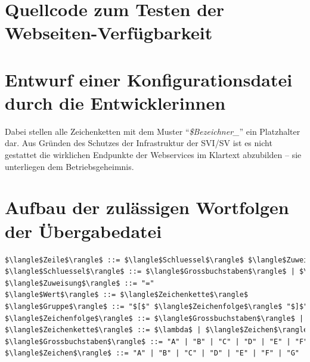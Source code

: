 \clearpage

\section{Quellcode zum Testen der Webseiten-Verfügbarkeit}


\clearpage

\section{Entwurf einer Konfigurationsdatei durch die Entwicklerinnen}


Dabei stellen alle Zeichenketten mit dem Muster \enquote{\textit{\$Bezeichner\_}} ein Platzhalter dar. Aus Gründen des Schutzes der Infrastruktur der \ac{SVI}/\ac{SV} ist es nicht gestattet die wirklichen Endpunkte der Webservices im Klartext abzubilden -- sie unterliegen dem Betriebsgeheimnis.

\clearpage
\section{Aufbau der zulässigen Wortfolgen der Übergabedatei}

\begin{lstlisting}[language=html, caption={\ac{BNF} der Übergabedatei}, label=lst:bnfDatei, mathescape=true]
$\langle$Zeile$\rangle$ ::= $\langle$Schluessel$\rangle$ $\langle$Zuweisung$\rangle$  $\langle$Wert$\rangle$ $\langle$EOL$\rangle$ | $\langle$Gruppe$\rangle$ $\langle$EOL$\rangle$ | $\lambda$ $\langle$EOL$\rangle$
$\langle$Schluessel$\rangle$ ::= $\langle$Grossbuchstaben$\rangle$ | $\langle$Grossbuchstaben$\rangle$ $\langle$Schluessel$\rangle$
$\langle$Zuweisung$\rangle$ ::= "="
$\langle$Wert$\rangle$ ::= $\langle$Zeichenkette$\rangle$
$\langle$Gruppe$\rangle$ ::= "$[$" $\langle$Zeichenfolge$\rangle$ "$]$"
$\langle$Zeichenfolge$\rangle$ ::= $\langle$Grossbuchstaben$\rangle$ | $\langle$Grossbuchstaben$\rangle$ $\langle$Zeichenfolge$\rangle$
$\langle$Zeichenkette$\rangle$ ::= $\lambda$ | $\langle$Zeichen$\rangle$ | $\langle$Zeichen$\rangle$ $\langle$Zeichenkette$\rangle$
$\langle$Grossbuchstaben$\rangle$ ::= "A" | "B" | "C" | "D" | "E" | "F" | "G" | "H" | "I" | "J" | "K" | "L" | "M" | "N" | "O" | "P" | "Q" | "R" | "S" | "T" | "U" | "V" | "W" | "X" | "Y" | "Z" | 
$\langle$Zeichen$\rangle$ ::= "A" | "B" | "C" | "D" | "E" | "F" | "G" | "H" | "I" | "J" | "K" | "L" | "M" | "N" | "O" | "P" | "Q" | "R" | "S" | "T" | "U" | "V" | "W" | "X" | "Y" | "Z" | "_" | "/" | "-" | ":" | "." | "a" | "b" | "c" | "d" | "e" | "f" | "g" | "h" | "i" | "j" | "k" | "l" | "m" | "n" | "o" | "p" | "q" | "r" | "s" | "t" | "u" | "v" | "w" | "x" | "y" | "z"
\end{lstlisting}
\clearpage

